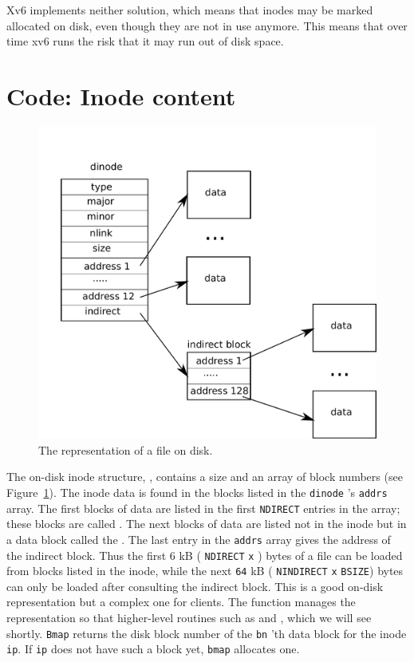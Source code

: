 Xv6 implements neither solution, which means that inodes may be marked allocated
on disk, even though they are not in use anymore.  This means that over time xv6
runs the risk that it may run out of disk space.
\section{Code: Inode content}

\begin{figure}[t]
\center
\includegraphics[scale=0.5]{fig/inode.pdf}
\caption{The representation of a file on disk.}
\label{fig:inode}
\end{figure}

The on-disk inode structure,
,
contains a size and an array of block numbers (see 
Figure~\ref{fig:inode}).
The inode data is found in the blocks listed
in the
\lstinline{dinode} 's
\lstinline{addrs}
array.
The first
blocks of data are listed in the first
\lstinline{NDIRECT}
entries in the array; these blocks are called 
.
The next 
blocks of data are listed not in the inode
but in a data block called the
.
The last entry in the
\lstinline{addrs}
array gives the address of the indirect block.
Thus the first 6 kB (
\lstinline{NDIRECT} 
\lstinline{x}
)
bytes of a file can be loaded from blocks listed in the inode,
while the next
\lstinline{64} kB (
\lstinline{NINDIRECT}
\lstinline{x}
\lstinline{BSIZE})
bytes can only be loaded after consulting the indirect block.
This is a good on-disk representation but a 
complex one for clients.
The function
manages the representation so that higher-level routines such as
and
,
which we will see shortly.
\lstinline{Bmap}
returns the disk block number of the
\lstinline{bn} 'th
data block for the inode
\lstinline{ip}.
If
\lstinline{ip}
does not have such a block yet,
\lstinline{bmap}
allocates one.

